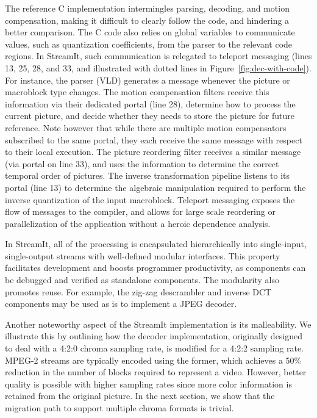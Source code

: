 The reference C implementation intermingles parsing, decoding, and
motion compensation, making it difficult to clearly follow the code,
and hindering a better comparison. The C code also relies on global
variables to communicate values, such as quantization coefficients,
from the parser to the relevant code regions. In StreamIt, such
communication is relegated to teleport messaging (lines 13, 25, 28, and
33, and illustrated with dotted lines in
Figure~\ref{fig:dec-with-code}). For instance, the parser (VLD)
generates a message whenever the picture or macroblock type
changes. The motion compensation filters receive this information via
their dedicated portal (line 28), determine how to process the current
picture, and decide whether they needs to store the picture for future
reference. Note however that while there are multiple motion compensators
subscribed to the same portal, they each receive the same message with
respect to their local execution.
The picture reordering filter receives a similar message
(via portal on line 33), and uses the information to determine the
correct temporal order of pictures. The inverse transformation
pipeline listens to its portal (line 13) to determine the algebraic
manipulation required to perform the inverse quantization of the input
macroblock. Teleport messaging 
exposes the flow of messages to the compiler, and allows for large
scale reordering or parallelization of the application without a
heroic dependence analysis.

In StreamIt, all of the processing is encapsulated hierarchically into
single-input, single-output streams with well-defined modular
interfaces. This property facilitates development and boosts
programmer productivity, as components can be debugged and verified as
standalone components. The modularity also promotes reuse. For
example, the zig-zag descrambler and inverse DCT
components may be used as is to implement a JPEG decoder.

Another noteworthy aspect of the StreamIt implementation is its
malleability. We illustrate this by outlining how the decoder
implementation, originally designed to deal with a 4:2:0 chroma
sampling rate, is modified for a 4:2:2 sampling rate. MPEG-2 streams
are typically encoded using the former, which achieves a 50\%
reduction in the number of blocks required to represent a
video. However, better quality is possible with higher sampling rates
since more color information is retained from the original picture. In
the next section, we show that the migration path to support multiple
chroma formats is trivial.

